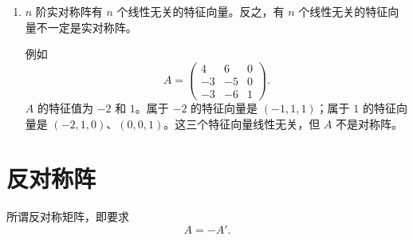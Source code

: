 \begin{enumerate}
\item $n$ 阶实对称阵有 $n$ 个线性无关的特征向量。反之，有 $n$ 个线性无关的特征向量不一定是实对称阵。

例如
\[
 A=\begin{pmatrix}
 4&6&0\\
 -3&-5&0\\
 -3&-6&1
 \end{pmatrix}.
\]
$A$ 的特征值为 $-2$ 和 $1$。属于 $-2$ 的特征向量是 $(-1,1,1)$；属于 $1$ 的特征向量是 $(-2,1,0)$、$(0,0,1)$。这三个特征向量线性无关，但 $A$ 不是对称阵。
\end{enumerate}

\section{反对称阵}

所谓反对称矩阵，即要求
\[
 A=-A'.
\]

